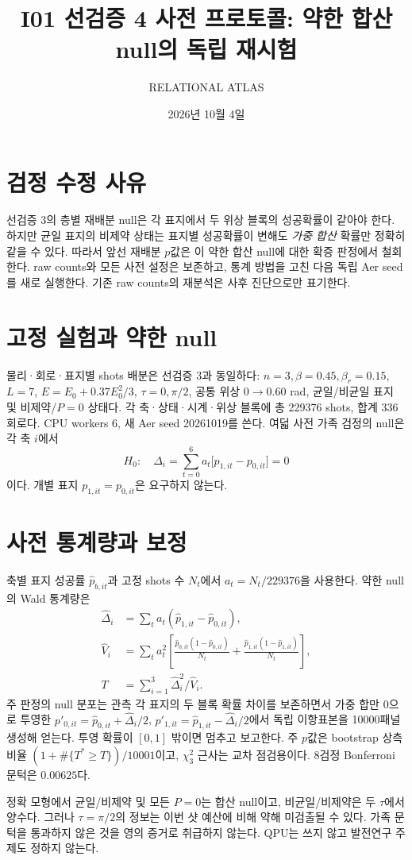 \documentclass[11pt,a4paper]{article}
\title{I01 선검증 4 사전 프로토콜: 약한 합산 null의 독립 재시험}
\author{RELATIONAL ATLAS}
\date{2026년 10월 4일}
\begin{document}
\maketitle

\section{검정 수정 사유}
선검증 3의 층별 재배분 null은 각 표지에서 두 위상 블록의 성공확률이
같아야 한다. 하지만 균일 표지의 비제약 상태는 표지별 성공확률이
변해도 \emph{가중 합산} 확률만 정확히 같을 수 있다. 따라서 앞선
재배분 $p$값은 이 약한 합산 null에 대한 확증 판정에서 철회한다.
raw counts와 모든 사전 설정은 보존하고, 통계 방법을 고친 다음
독립 Aer seed를 새로 실행한다. 기존 raw counts의 재분석은
사후 진단으로만 표기한다.

\section{고정 실험과 약한 null}
물리·회로·표지별 shots 배분은 선검증 3과 동일하다:
$n=3,\beta=0.45,\beta_r=0.15$, $L=7$,
$E=E_0+0.37E_0^2/3$, $\tau=0,\pi/2$,
공통 위상 $0\to0.60$ rad, 균일/비균일 표지 및
비제약/$P=0$ 상태다. 각 축·상태·시계·위상 블록에
총 229376 shots, 합계 336회로다. CPU workers 6,
새 Aer seed 20261019를 쓴다. 여덟 사전 가족 검정의 null은
각 축 $i$에서
\begin{equation}
H_0:\quad \Delta_i=\sum_{t=0}^{6}a_t
\bigl[p_{1,it}-p_{0,it}\bigr]=0
\end{equation}
이다. 개별 표지 $p_{1,it}=p_{0,it}$은 요구하지 않는다.

\section{사전 통계량과 보정}
축별 표지 성공률 $\hat p_{b,it}$과 고정 shots 수 $N_t$에서
$a_t=N_t/229376$을 사용한다. 약한 null의 Wald 통계량은
\begin{align}
\hat\Delta_i&=\sum_t a_t(\hat p_{1,it}-\hat p_{0,it}),\\
\hat V_i&=\sum_t a_t^2\left[
\frac{\hat p_{0,it}(1-\hat p_{0,it})}{N_t}+
\frac{\hat p_{1,it}(1-\hat p_{1,it})}{N_t}\right],\\
T&=\sum_{i=1}^{3}\hat\Delta_i^2/\hat V_i.
\end{align}
주 판정의 null 분포는 관측 각 표지의 두 블록 확률 차이를 보존하면서
가중 합만 0으로 투영한
$p'_{0,it}=\hat p_{0,it}+\hat\Delta_i/2$,
$p'_{1,it}=\hat p_{1,it}-\hat\Delta_i/2$에서
독립 이항표본을 10000패널 생성해 얻는다. 투영 확률이 $[0,1]$
밖이면 멈추고 보고한다. 주 $p$값은 bootstrap 상측비율
$(1+\#\{T^*\ge T\})/10001$이고, $\chi^2_3$ 근사는
교차 점검용이다. 8검정 Bonferroni 문턱은 $0.00625$다.

정확 모형에서 균일/비제약 및 모든 $P=0$는 합산 null이고,
비균일/비제약은 두 $\tau$에서 양수다. 그러나 $\tau=\pi/2$의
정보는 이번 샷 예산에 비해 약해 미검출될 수 있다.
가족 문턱을 통과하지 않은 것을 영의 증거로 취급하지 않는다.
QPU는 쓰지 않고 발전연구 주제도 정하지 않는다.
\end{document}
